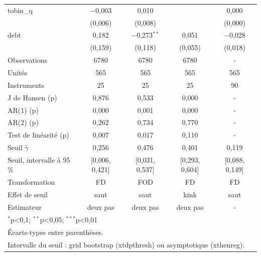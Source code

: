 \begin{table}[!htbp]
\begin{tabular}{lcccc}
tobin\_q & $-$0,003 & 0,010 &  & 0,000 \\
 & (0,006) & (0,008) &  & (0,000) \\
debt & 0,182 & $-$0,273$^{**}$ & 0,051 & $-$0,028 \\
 & (0,159) & (0,118) & (0,055) & (0,018) \\
\midrule
Observations & 6780 & 6780 & 6780 & - \\
Unités & 565 & 565 & 565 & 565 \\
Instruments & 25 & 25 & 25 & 90 \\
J de Hansen (p) & 0,876 & 0,533 & 0,000 & - \\
AR(1) (p) & 0,000 & 0,001 & 0,000 & - \\
AR(2) (p) & 0,262 & 0,734 & 0,770 & - \\
Test de linéarité (p) & 0,007 & 0,017 & 0,110 & - \\
Seuil $\hat{\gamma}$ & 0,256 & 0,476 & 0,401 & 0,119 \\
Seuil, intervalle à 95 \% & [0,006, 0,421] & [0,031, 0,537] & [0,293, 0,604] & [0,088, 0,149] \\
Transformation & FD & FOD & FD & FD \\
Effet de seuil & saut & saut & kink & saut \\
Estimateur & deux pas & deux pas & deux pas & - \\
\bottomrule
\multicolumn{5}{l}{\footnotesize $^{*}$p\textless{}0,1; $^{**}$p\textless{}0,05; $^{***}$p\textless{}0,01} \\
\multicolumn{5}{l}{\footnotesize Écarts-types entre parenthèses.} \\
\multicolumn{5}{l}{\footnotesize Intervalle du seuil : grid bootstrap (xtdpthresh) ou asymptotique (xthenreg).} \\
\end{tabular}
\end{table}
